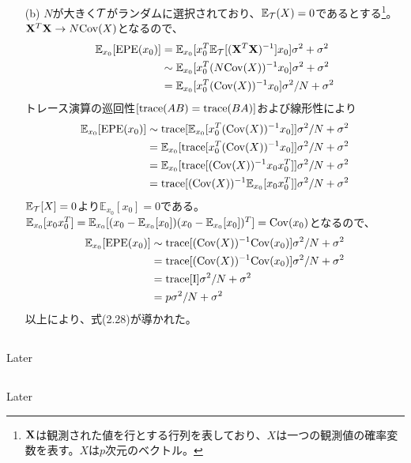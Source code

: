\documentclass{jsarticle}
\begin{document}
\begin{enumerate}
\item[(b)]
$N$が大きく${\cal T}$がランダムに選択されており、$\mathbb{E}_{\cal T}(X)=0$であるとする\footnote{${\bf X}$は観測された値を行とする行列を表しており、$X$は一つの観測値の確率変数を表す。$X$は$p$次元のベクトル。}。${\bf X}^T{\bf X}\to N{\rm Cov}(X)$となるので、
\begin{align*}
\mathbb{E}_{x_0}[{\rm EPE}(x_0)]&=\mathbb{E}_{x_0}[x_0^T \mathbb{E}_{\cal T}[({\bf X}^T{\bf X})^{-1}]x_0]\sigma^2+\sigma^2\\
&\sim\mathbb{E}_{x_0}[x_0^T (N{\rm Cov}(X))^{-1}x_0]\sigma^2+\sigma^2\\
&=\mathbb{E}_{x_0}[x_0^T ({\rm Cov}(X))^{-1}x_0]\sigma^2/N+\sigma^2
\end{align*}
トレース演算の巡回性$[{\rm trace}(AB)={\rm trace}(BA)]$および線形性により
\begin{align*}
\mathbb{E}_{x_0}[{\rm EPE}(x_0)]&\sim{\rm trace}[\mathbb{E}_{x_0}[x_0^T ({\rm Cov}(X))^{-1}x_0]]\sigma^2/N+\sigma^2\\
&=\mathbb{E}_{x_0}[{\rm trace}[x_0^T ({\rm Cov}(X))^{-1}x_0]]\sigma^2/N+\sigma^2\\
&=\mathbb{E}_{x_0}[{\rm trace}[ ({\rm Cov}(X))^{-1}x_0x_0^T]]\sigma^2/N+\sigma^2\\
&={\rm trace}[ ({\rm Cov}(X))^{-1}\mathbb{E}_{x_0}[x_0x_0^T]]\sigma^2/N+\sigma^2
\end{align*}
$\mathbb{E}_{\cal T}[X]=0$より$\mathbb{E}_{x_0}[x_0]=0$である。$\mathbb{E}_{x_0}[x_0x_0^T]=\mathbb{E}_{x_0}[(x_0-\mathbb{E}_{x_0}[x_0])(x_0-\mathbb{E}_{x_0}[x_0])^T]={\rm Cov}(x_0)$となるので、
\begin{align*}
\mathbb{E}_{x_0}[{\rm EPE}(x_0)]&\sim{\rm trace}[ ({\rm Cov}(X))^{-1}{\rm Cov}(x_0)]\sigma^2/N+\sigma^2\\
&={\rm trace}[ ({\rm Cov}(X))^{-1}{\rm Cov}(x_0)]\sigma^2/N+\sigma^2\\
&={\rm trace}[{\rm I}]\sigma^2/N+\sigma^2\\
&=p\sigma^2/N+\sigma^2
\end{align*}
以上により、式(2.28)が導かれた。
\end{enumerate}







\subsection{}
Later 

\subsection{}
Later
\end{document}
